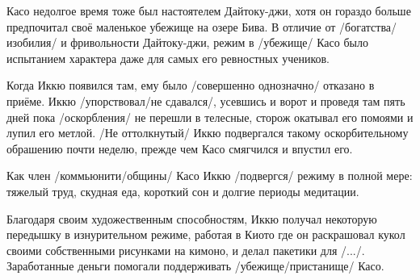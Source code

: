 
\begin{ver}
Касо недолгое время тоже был настоятелем Дайтоку-джи, хотя он гораздо
больше предпочитал своё маленькое убежище на озере Бива. В отличие от
/богатства/изобилия/ и фривольности Дайтоку-джи, режим в
/убежище/ Касо было испытанием характера даже для самых
его  ревностных учеников. 

Когда Иккю появился там, ему было /совершенно однозначно/ отказано в
приёме. Иккю /упорствовал/не сдавался/, усевшись и ворот и проведя там
пять дней пока /оскорбления/ не перешли в телесные,
сторож окатывал его помоями и лупил его метлой. /Не
оттолкнутый/ Иккю подвергался такому оскорбительному
обрашению почти неделю, прежде чем Касо смягчился и впустил его.

Как член /коммьюнити/общины/ Касо Иккю /подвергся/ режиму в полной
мере: тяжелый труд, скудная еда, короткий сон и долгие периоды
медитации.   

Благодаря своим художественным способностям, Иккю получал
некоторую передышку в изнурительном режиме, работая в Киото где он
раскрашовал кукол своими собственными рисунками на кимоно, и делал пакетики для /.../. Заработанные деньги
помогали поддерживать /убежище/пристанище/ Касо. 
\end{ver}

